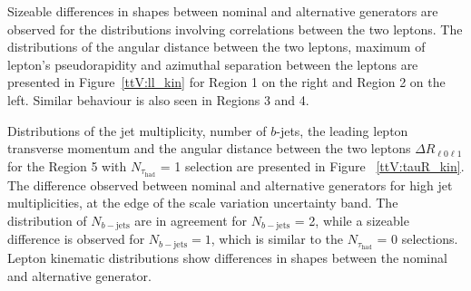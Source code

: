 Sizeable differences in shapes between nominal and alternative generators are observed for the distributions involving correlations between the two leptons.
The distributions of the angular distance between the two leptons, maximum of lepton's pseudorapidity and azimuthal separation between the leptons are presented in Figure~\ref{ttV:ll_kin} for Region 1 on the right and Region 2 on the left. 
Similar behaviour is also seen in Regions 3 and 4.

Distributions of the jet multiplicity, number of $b$-jets, the leading lepton transverse momentum and the angular distance between the two leptons  $\Delta R _{\ell 0\ell1 }$ for the Region 5 with $N_{\tau_\mathrm{had}}$ = 1 selection are presented in Figure ~\ref{ttV:tauR_kin}.
The difference observed between nominal and alternative generators for high jet multiplicities, at the edge of the scale variation uncertainty band. 
The distribution of $N_{b-\mathrm{jets}}$ are in agreement for $N_{b-\mathrm{jets}}$ = 2, while a sizeable difference is observed for $N_{b-\mathrm{jets}} = 1$, which is similar to the $N_{\tau_\mathrm{had}}$ = 0 selections. 
Lepton kinematic distributions show differences in shapes between the nominal and alternative generator.

